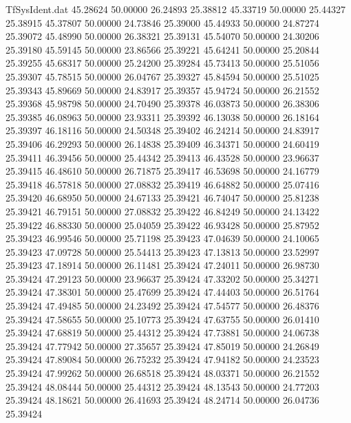 \begin{filecontents}{TfSysIdent.dat}
  45.28624   50.00000   26.24893   25.38812
  45.33719   50.00000   25.44327   25.38915
  45.37807   50.00000   24.73846   25.39000
  45.44933   50.00000   24.87274   25.39072
  45.48990   50.00000   26.38321   25.39131
  45.54070   50.00000   24.30206   25.39180
  45.59145   50.00000   23.86566   25.39221
  45.64241   50.00000   25.20844   25.39255
  45.68317   50.00000   25.24200   25.39284
  45.73413   50.00000   25.51056   25.39307
  45.78515   50.00000   26.04767   25.39327
  45.84594   50.00000   25.51025   25.39343
  45.89669   50.00000   24.83917   25.39357
  45.94724   50.00000   26.21552   25.39368
  45.98798   50.00000   24.70490   25.39378
  46.03873   50.00000   26.38306   25.39385
  46.08963   50.00000   23.93311   25.39392
  46.13038   50.00000   26.18164   25.39397
  46.18116   50.00000   24.50348   25.39402
  46.24214   50.00000   24.83917   25.39406
  46.29293   50.00000   26.14838   25.39409
  46.34371   50.00000   24.60419   25.39411
  46.39456   50.00000   25.44342   25.39413
  46.43528   50.00000   23.96637   25.39415
  46.48610   50.00000   26.71875   25.39417
  46.53698   50.00000   24.16779   25.39418
  46.57818   50.00000   27.08832   25.39419
  46.64882   50.00000   25.07416   25.39420
  46.68950   50.00000   24.67133   25.39421
  46.74047   50.00000   25.81238   25.39421
  46.79151   50.00000   27.08832   25.39422
  46.84249   50.00000   24.13422   25.39422
  46.88330   50.00000   25.04059   25.39422
  46.93428   50.00000   25.87952   25.39423
  46.99546   50.00000   25.71198   25.39423
  47.04639   50.00000   24.10065   25.39423
  47.09728   50.00000   25.54413   25.39423
  47.13813   50.00000   23.52997   25.39423
  47.18914   50.00000   26.11481   25.39424
  47.24011   50.00000   26.98730   25.39424
  47.29123   50.00000   23.96637   25.39424
  47.33202   50.00000   25.34271   25.39424
  47.38301   50.00000   25.47699   25.39424
  47.44403   50.00000   26.51764   25.39424
  47.49485   50.00000   24.23492   25.39424
  47.54577   50.00000   26.48376   25.39424
  47.58655   50.00000   25.10773   25.39424
  47.63755   50.00000   26.01410   25.39424
  47.68819   50.00000   25.44312   25.39424
  47.73881   50.00000   24.06738   25.39424
  47.77942   50.00000   27.35657   25.39424
  47.85019   50.00000   24.26849   25.39424
  47.89084   50.00000   26.75232   25.39424
  47.94182   50.00000   24.23523   25.39424
  47.99262   50.00000   26.68518   25.39424
  48.03371   50.00000   26.21552   25.39424
  48.08444   50.00000   25.44312   25.39424
  48.13543   50.00000   24.77203   25.39424
  48.18621   50.00000   26.41693   25.39424
  48.24714   50.00000   26.04736   25.39424

\end{filecontents}
